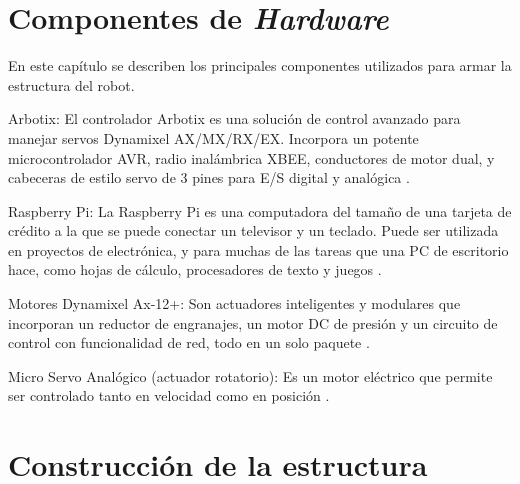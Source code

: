 \documentclass[tikz,conference, letterpaper]{IEEEtranMC1}
\begin{document}
\section{Componentes de \emph{Hardware}}
\label{sec:Componentesdehardware}


En este capítulo se describen los principales componentes utilizados para armar la estructura del robot. 

Arbotix: El controlador Arbotix es una solución de control avanzado para manejar servos Dynamixel AX/MX/RX/EX. Incorpora un potente microcontrolador AVR, radio inalámbrica XBEE, conductores de motor dual, y cabeceras de estilo servo de 3 pines para E/S digital y analógica \cite{arbotix}.
 
Raspberry Pi: La Raspberry Pi es una computadora del tamaño de una tarjeta de crédito a la que se puede conectar un televisor y un teclado. Puede ser utilizada en proyectos de electrónica, y para muchas de las tareas que una PC de escritorio hace, como hojas de cálculo, procesadores de texto y juegos \cite{raspberry}.

Motores Dynamixel Ax-12+: Son actuadores inteligentes y modulares que incorporan un reductor de engranajes, un motor DC de presión y un circuito de control con funcionalidad de red, todo en un solo paquete \cite{manual}.

Micro Servo Analógico (actuador rotatorio): Es un motor eléctrico que permite ser controlado tanto en velocidad como en posición  \cite{robots}.



\section{Construcción de la estructura}
\label{sec:Estru}
\end{document}
